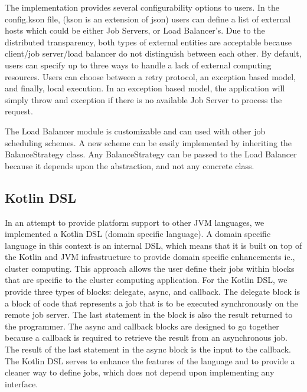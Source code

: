 The implementation provides several configurability options to users.
In the config.kson file, (kson is an extension of json) users can
define a list of external hosts which could be either Job Servers,
or Load Balancer's.
Due to the distributed transparency, both types of external entities
are acceptable because client/job server/load balancer do
not distinguish between each other.
By default, users can specify up to three ways to handle
a lack of external computing resources.
Users can choose between a retry protocol, an exception based model,
and finally, local execution.
In an exception based model, the application will simply throw
and exception if there is no available Job Server
to process the request.

The Load Balancer module is customizable and can used with other
job scheduling schemes.
A new scheme can be easily implemented by inheriting the BalanceStrategy
class.
Any BalanceStrategy can be passed to the Load Balancer because it depends upon
the abstraction, and not any concrete class.

\subsection{Kotlin DSL}\label{subsec:kotlinDsl}

In an attempt to provide platform support to other JVM languages, we
implemented a Kotlin DSL (domain specific language).
A domain specific language in this context is an internal DSL, which
means that it is built on top of the Kotlin and JVM infrastructure
to provide domain specific enhancements ie., cluster computing.
This approach allows the user define their jobs within blocks
that are specific to the cluster computing application.
For the Kotlin DSL, we provide three types of blocks:
delegate, async, and callback.
The delegate block is a block of code that represents a job
that is to be executed synchronously on the remote job server.
The last statement in the block is also the result returned to the
programmer.
The async and callback blocks are designed to go together because
a callback is required to retrieve the result from an asynchronous
job.
The result of the last statement in the async block is the input
to the callback.
The Kotlin DSL serves to enhance the features of the language and to
provide a cleaner way to define jobs, which does not depend upon
implementing any interface.
